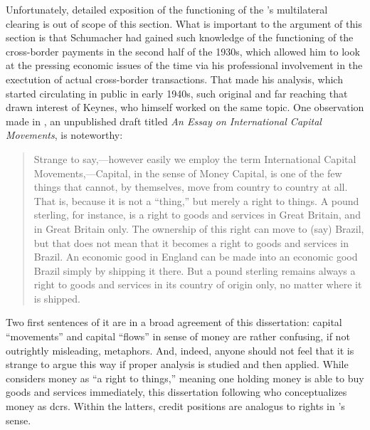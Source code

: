 Unfortunately, detailed exposition of the functioning of the \citeauthor{schumacher1943}'s multilateral clearing is out of scope of this section. What is important to the argument of this section is that Schumacher had gained such knowledge of the functioning of the cross-border payments  in the second half of the 1930s, which allowed him to look at the pressing economic issues of the time via his professional involvement in the exectution of actual cross-border transactions. That made his analysis, which started circulating in public in early 1940s, such original and far reaching that drawn interest of Keynes, who himself worked on the same topic. One observation made in \cite{schumacher1939}, an unpublished draft titled \textit{An Essay on International Capital Movements}, is noteworthy: 
\begin{quote}
Strange to say,---however easily we employ the term International Capital Movements,---Capital, in the sense of Money Capital, is one of the few things that cannot, by themselves, move from country to country at all. That is, because it is not a ``thing,'' but merely a right to things. A pound sterling, for instance, is a right to goods and services in Great Britain, and in Great Britain only. The ownership of this right can move to (say) Brazil, but that does not mean that it becomes a right to goods and services in Brazil. An economic good in England can be made into an economic good Brazil simply by shipping it there. But a pound sterling remains always a right to goods and services in its country of origin only, no matter where it is shipped.~\citep[pp.~3-4]{schumacher1939}
\end{quote}

Two first sentences of it are in a broad agreement of this dissertation: capital ``movements'' and capital ``flows'' in sense of money are rather confusing, if not outrightly misleading, metaphors. And, indeed, anyone should not feel that it is strange to argue this way if proper analysis is studied and then applied. While \citeauthor{schumacher1943} considers money as ``a right to things,'' meaning one holding money is able to buy goods and services immediately, this dissertation following \citeauthor{innes1913} who conceptualizes money as \acfp{dcr}. Within the latters, credit positions are analogus to rights in \citeauthor{schumacher1943}'s sense.  

